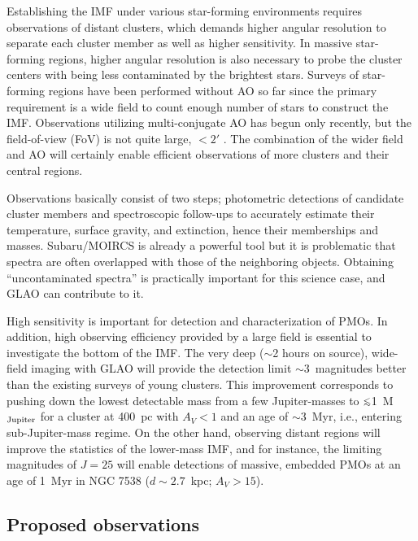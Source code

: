 Establishing the IMF under various star-forming environments requires
observations of distant clusters, which demands higher angular
resolution to separate each cluster member as well as higher
sensitivity. In massive star-forming regions, higher angular resolution
is also necessary to probe the cluster centers with being less
contaminated by the brightest stars. Surveys of star-forming regions
have been performed without AO so far since the primary requirement is a
wide field to count enough number of stars to construct the
IMF. Observations utilizing multi-conjugate AO has begun only recently,
but the field-of-view (FoV) is not quite large, $<2'$
\citep{pes13,bou09}.  
The combination of the wider field and AO will certainly enable
efficient observations of more clusters and their central regions.  

Observations basically consist of two steps; photometric detections of
candidate cluster members and spectroscopic follow-ups to accurately
estimate their temperature, surface gravity, and extinction, hence their
memberships and masses. Subaru/MOIRCS is already a powerful tool but it
is problematic that spectra are often overlapped with those of the
neighboring objects. Obtaining ``uncontaminated spectra'' is practically 
important for this science case, and GLAO can contribute to it.  

High sensitivity is important for detection and characterization of
PMOs. In addition, high observing efficiency provided by a large field
is essential to investigate the bottom of the IMF. The very deep
($\sim$2 hours on source), wide-field imaging with GLAO will provide the
detection limit $\sim$3~magnitudes better than the existing surveys of
young clusters. This improvement corresponds to pushing down the lowest
detectable mass from a few Jupiter-masses  to $\lsim$1~M$_{\rm Jupiter}$
for a cluster at 400~pc with $A_V < 1 $ and an age of $\sim$3~Myr, i.e.,
entering sub-Jupiter-mass regime.  On the other hand, observing distant
regions will improve the statistics of the lower-mass IMF, and for
instance, the limiting magnitudes of $J=25$ will enable detections of
massive, embedded PMOs at an age of 1~Myr in NGC 7538 ($d \sim 2.7$~kpc;
$A_V>15$). 


\subsection{Proposed observations}

